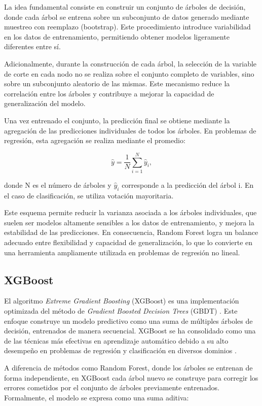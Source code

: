 La idea fundamental consiste en construir un conjunto de árboles de decisión, donde cada árbol se entrena sobre un subconjunto de datos generado mediante muestreo con reemplazo (bootstrap). Este procedimiento introduce variabilidad en los datos de entrenamiento, permitiendo obtener modelos ligeramente diferentes entre sí.

Adicionalmente, durante la construcción de cada árbol, la selección de la variable de corte en cada nodo no se realiza sobre el conjunto completo de variables, sino sobre un subconjunto aleatorio de las mismas. Este mecanismo reduce la correlación entre los árboles y contribuye a mejorar la capacidad de generalización del modelo.

Una vez entrenado el conjunto, la predicción final se obtiene mediante la agregación de las predicciones individuales de todos los árboles. En problemas de regresión, esta agregación se realiza mediante el promedio:

\begin{equation}
\hat{y} = \frac{1}{N} \sum_{i=1}^{N} \hat{y}_i,
\end{equation}

\noindent donde N es el número de árboles y $\hat{y}_i$ corresponde a la predicción del árbol i. En el caso de clasificación, se utiliza votación mayoritaria.

Este esquema permite reducir la varianza asociada a los árboles individuales, que suelen ser modelos altamente sensibles a los datos de entrenamiento, y mejora la estabilidad de las predicciones. En consecuencia, Random Forest logra un balance adecuado entre flexibilidad y capacidad de generalización, lo que lo convierte en una herramienta ampliamente utilizada en problemas de regresión no lineal.

\subsection{XGBoost}
El algoritmo \textit{Extreme Gradient Boosting} (XGBoost) es una implementación optimizada del método de \textit{Gradient Boosted Decision Trees} (GBDT) \citep{chen2016xgboost}. Este enfoque construye un modelo predictivo como una suma de múltiples árboles de decisión, entrenados de manera secuencial. XGBoost se ha consolidado como una de las técnicas más efectivas en aprendizaje automático debido a su alto desempeño en problemas de regresión y clasificación en diversos dominios \citep{espinoza2020aplicacion}.

A diferencia de métodos como Random Forest, donde los árboles se entrenan de forma independiente, en XGBoost cada árbol nuevo se construye para corregir los errores cometidos por el conjunto de árboles previamente entrenados. Formalmente, el modelo se expresa como una suma aditiva:

